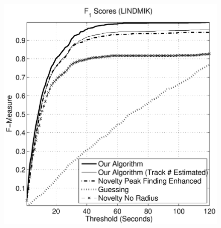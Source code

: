 \documentclass[twocolumn]{article}
\begin{document}
\begin{figure}
\begin{center}
		\begin{minipage}[t]{0.45\linewidth}
			\begin{center}
				\includegraphics[scale=0.5]{images/lindmik}
			\end{center}
		\end{minipage}
		\begin{minipage}[t]{0.45\linewidth}
			\begin{center}

\end{center}
\end{minipage}
\end{center}
\end{figure}
\end{document}
